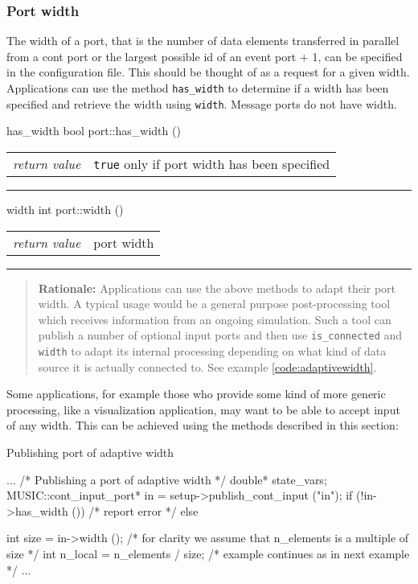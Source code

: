 \documentclass[a4paper]{report}
\makeatletter
\newenvironment{rationale}%
{\par\begin{quote}\textbf{Rationale:}}%
{\par\end{quote}}
\newenvironment{parameters}%
{\begin{tabular}{@{\hspace{2em}}lp{0.6\textwidth}}}%
{\end{tabular}\par\vspace{1mm}\par\hrule\par\vspace{5mm}}
\makeatother
\begin{document}
\subsubsection{Port width}
\label{sec:width}

The width of a port, that is the number of data
elements transferred in parallel from a cont port or the largest
possible id of an event port $+$ 1, can be specified in the
configuration file.  This should be thought of as a request for a
given width.  Applications can use the method \lstinline|has_width| to
determine if a width has been specified and retrieve the width using
\lstinline|width|.  Message ports do not have width.

\begin{head}{has_width}
  bool port::has_width ()
\end{head}
\begin{parameters}
  \emph{return value} & \lstinline|true| only if port width has been
                         specified \\
\end{parameters}

\begin{head}{width}
  int port::width ()
\end{head}
\begin{parameters}
  \emph{return value} & port width \\
\end{parameters}

\begin{rationale}
  Applications can use the above methods to adapt their port width.  A
  typical usage would be a general purpose post-processing tool which
  receives information from an ongoing simulation.  Such a tool can
  publish a number of optional input ports and then use
  \lstinline|is_connected| and \lstinline|width| to adapt its internal
  processing depending on what kind of data source it is actually
  connected to.  See example \ref{code:adaptivewidth}.
\end{rationale}


Some applications, for example those who provide some kind of more
generic processing, like a visualization application, may want to be
able to accept input of any width.  This can be achieved using the
methods described in this section:

\begin{code}{Publishing port of adaptive width\label{code:adaptivewidth}}
{
  ...
  /* Publishing a port of adaptive width */
  double* state_vars;
  MUSIC::cont_input_port* in =
     setup->publish_cont_input ("in");
  if (!in->has_width ())
    /* report error */
  else
    {
      int size = in->width ();
      /* for clarity we assume that n_elements
         is a multiple of size */
      int n_local = n_elements / size;
      /* example continues as in next example */
      ...
      
    }
}
\end{code}
\end{document}
